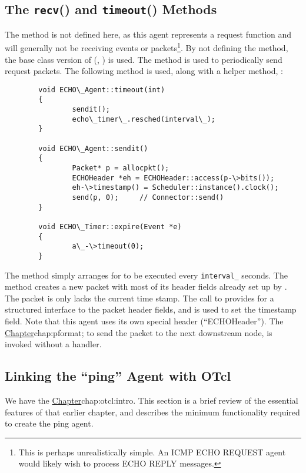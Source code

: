 \subsection{The \texttt{recv}() and \texttt{timeout}() Methods}
\label{sec:agents:exmethods}

The  method is not defined here, as this agent
represents a request function and will generally not be receiving
events or packets\footnote{This is perhaps unrealistically simple.
An ICMP ECHO REQUEST agent would likely wish to process
ECHO REPLY messages.}.
By not defining the  method, the base class version
of  (\ie, ) is used.
The  method is used to periodically send request packets.
The following  method is used, along with a helper
method, :
\begin{verbatim}
        void ECHO\_Agent::timeout(int)
        {
                sendit();
                echo\_timer\_.resched(interval\_);
        }

        void ECHO\_Agent::sendit()
        {
                Packet* p = allocpkt();
                ECHOHeader *eh = ECHOHeader::access(p-\>bits());
                eh-\>timestamp() = Scheduler::instance().clock();
                send(p, 0);     // Connector::send()
        }

        void ECHO\_Timer::expire(Event *e)
        {
                a\_-\>timeout(0);
        }
\end{verbatim}
The  method simply arranges for  to be
executed every {\tt interval\_} seconds.
The  method creates a new packet with most of its
header fields already set up by .
The packet is only lacks the current time stamp. 
The call to  provides for a structured interface to the
packet header fields, and is used to set the timestamp field.
Note that this agent uses its own special header (``ECHOHeader'').
The 
\href{creation and use of packet headers is described in
later chapter}{Chapter}{chap:pformat};
to send the packet to the next downstream node, 
is invoked without a handler.

\subsection{Linking the ``ping'' Agent with OTcl}
\label{sec:agents:exlinkage}

We have the 
\href{methods and mechanisms for establishing OTcl Linkage earlier}{%
        Chapter}{chap:otcl:intro}.
This section is a brief review of the essential features of that
earlier chapter, and describes the minimum functionality required to 
create the ping agent.

